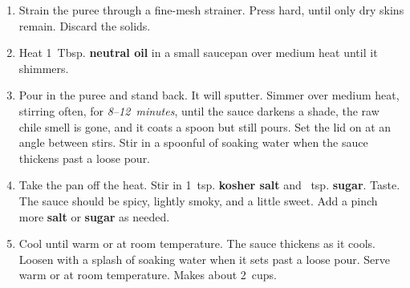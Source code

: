 \documentclass[11pt,letterpaper]{article}
\begin{document}
\begin{enumerate}
    \item Strain the puree through a fine-mesh strainer. Press hard, until only dry skins remain. Discard the solids.

    \item Heat 1~Tbsp. \textbf{neutral oil} in a small saucepan over medium heat until it shimmers.

    \item Pour in the puree and stand back. It will sputter. Simmer over medium heat, stirring often, for \textit{8--12~minutes}, until the sauce darkens a shade, the raw chile smell is gone, and it coats a spoon but still pours. Set the lid on at an angle between stirs. Stir in a spoonful of soaking water when the sauce thickens past a loose pour.

    \item Take the pan off the heat. Stir in 1~tsp. \textbf{kosher salt} and ~tsp. \textbf{sugar}. Taste. The sauce should be spicy, lightly smoky, and a little sweet. Add a pinch more \textbf{salt} or \textbf{sugar} as needed.

    \item Cool until warm or at room temperature. The sauce thickens as it cools. Loosen with a splash of soaking water when it sets past a loose pour. Serve warm or at room temperature. Makes about 2~cups.
\end{enumerate}

\newpage
\end{document}
